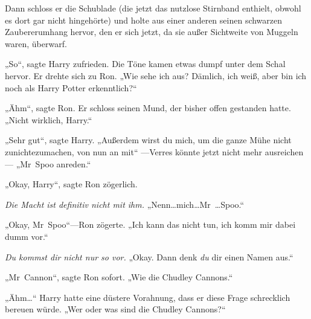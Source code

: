 Dann schloss er die Schublade (die jetzt das nutzlose Stirnband enthielt, obwohl es dort gar nicht hingehörte) und holte aus einer anderen seinen schwarzen Zaubererumhang hervor, den er sich jetzt, da sie außer Sichtweite von Muggeln waren, überwarf.

„So“, sagte Harry zufrieden. Die Töne kamen etwas dumpf unter dem Schal hervor. Er drehte sich zu Ron. „Wie sehe ich aus? Dämlich, ich weiß, aber bin ich noch als Harry Potter erkenntlich?“

„Ähm“, sagte Ron. Er schloss seinen Mund, der bisher offen gestanden hatte. „Nicht wirklich, Harry.“

„Sehr gut“, sagte Harry. „Außerdem wirst du mich, um die ganze Mühe nicht zunichtezumachen, von nun an mit“ —Verres könnte jetzt nicht mehr ausreichen— „Mr~Spoo anreden.“

„Okay, Harry“, sagte Ron zögerlich.

\emph{Die Macht ist definitiv nicht mit ihm.} „Nenn…mich…Mr~…Spoo.“

„Okay, Mr~Spoo“—Ron zögerte. „Ich kann das nicht tun, ich komm mir dabei dumm vor.“

\emph{Du kommst dir nicht nur so vor.} „Okay. Dann denk \emph{du} dir einen Namen aus.“

„Mr~Cannon“, sagte Ron sofort. „Wie die Chudley Cannons.“

„Ähm…“ Harry hatte eine düstere Vorahnung, dass er diese Frage schrecklich bereuen würde. „Wer oder was sind die Chudley Cannons?“

